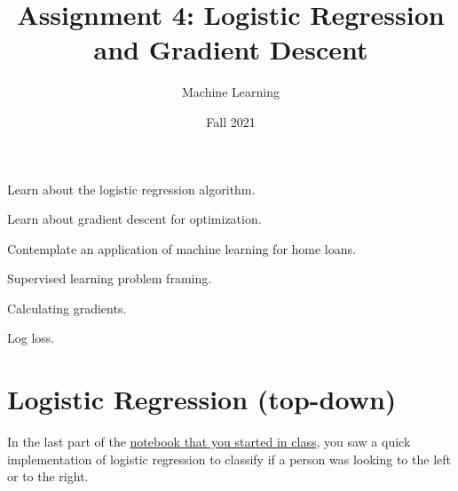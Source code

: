 \documentclass[assignment04_Solutions]{subfiles}
\title{Assignment 4: Logistic Regression and Gradient Descent}
\author{Machine Learning}
\date{Fall 2021}
\begin{document}
\maketitle
\thispagestyle{firstpage}


\begin{learningobjectives}
\bi
\item Learn about the logistic regression algorithm.
\item Learn about gradient descent for optimization.
\item Contemplate an application of machine learning for home loans.
\ei
\end{learningobjectives}

\begin{priorknowledge}
\bi
\item Supervised learning problem framing.
\item Calculating gradients.
\item Log loss.

\ei
\end{priorknowledge}
\vspace{1em}

%
%

\section{Logistic Regression (top-down)}

In the last part of the \href{https://colab.research.google.com/drive/1AOUbSKhEvoSTzu_UNm-kq1SBrmmXPHVl?usp=sharing}{notebook that you started in class}, you saw a quick implementation of logistic regression to classify if a person was looking to the left or to the right. 
\end{document}
